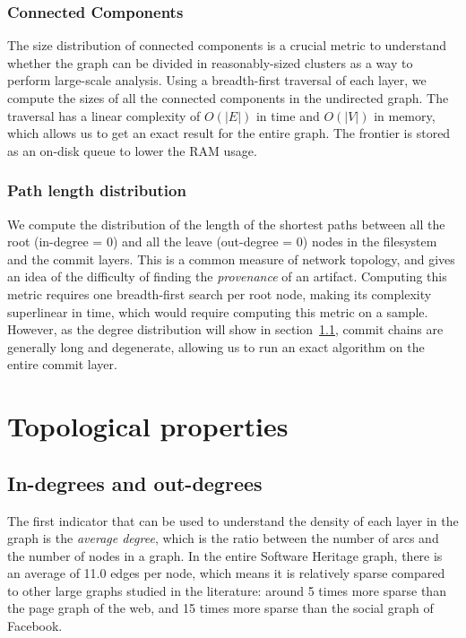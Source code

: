 \subsubsection{Connected Components}
The size distribution of connected components is a crucial metric to understand
whether the graph can be divided in reasonably-sized clusters as a way to
perform large-scale analysis.
Using a breadth-first traversal of each layer, we compute the sizes of all the
connected components in the undirected graph. The traversal has a linear
complexity of $O(|E|)$ in time and $O(|V|)$ in memory, which
allows us to get an exact result for the entire graph. The frontier is stored
as an on-disk queue to lower the RAM usage.

\subsubsection{Path length distribution}%
\label{sec:metho:shortestpath}

We compute the distribution of the length of the shortest paths between all the
root (in-degree = 0) and all the leave (out-degree = 0) nodes in the filesystem
and the commit layers. This is a common measure of network topology, and gives
an idea of the difficulty of finding the \emph{provenance} of an artifact.
Computing this metric requires one breadth-first search per root node, making
its complexity superlinear in time, which would require computing this metric
on a sample. However, as the degree distribution will show in
section~\cref{sec:topo:degrees},
commit chains are generally long and degenerate, allowing us to run an exact
algorithm on the entire commit layer.


\section{Topological properties}%
\label{sec:topology-results}

\subsection{In-degrees and out-degrees}%
\label{sec:topo:degrees}

The first indicator that can be used to understand the density of each layer in
the graph is the \emph{average degree}, which is the ratio between the number
of arcs and the number of nodes in a graph.
In the entire Software Heritage graph, there is an average of 11.0 edges per
node, which means it is relatively sparse compared to other large graphs
studied in the literature: around 5 times more sparse than the page graph of the
web, and 15 times more sparse than the social graph of Facebook.

